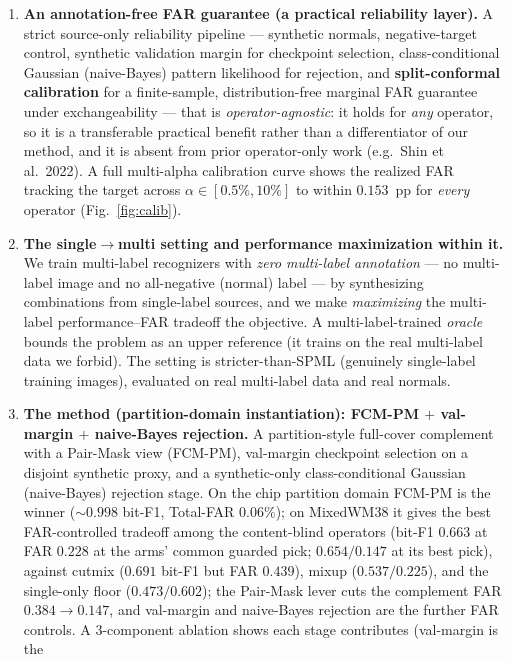 \documentclass[11pt]{article}
\begin{document}
\begin{enumerate}
  algorithmic content while independently corroborating the criterion.
\item \textbf{An annotation-free FAR guarantee (a practical reliability layer).} A strict
  source-only reliability pipeline --- synthetic normals, negative-target control, synthetic
  validation margin for checkpoint selection, class-conditional Gaussian (naive-Bayes)
  pattern likelihood for rejection, and \textbf{split-conformal calibration} for a
  finite-sample, distribution-free marginal FAR guarantee under exchangeability --- that is
  \emph{operator-agnostic}: it holds for \emph{any} operator, so it is a transferable
  practical benefit rather than a differentiator of our method, and it is absent from prior
  operator-only work (e.g.\ Shin et al.\ 2022). A full multi-alpha calibration curve shows
  the realized FAR tracking the target across $\alpha\in[0.5\%,10\%]$ to within $0.153$~pp
  for \emph{every} operator (Fig.~\ref{fig:calib}).
\item \textbf{The single$\to$multi setting and performance maximization within it.}
  We train multi-label recognizers with \emph{zero multi-label annotation} --- no
  multi-label image and no all-negative (normal) label --- by synthesizing
  combinations from single-label sources, and we make \emph{maximizing} the
  multi-label performance--FAR tradeoff the objective. A multi-label-trained
  \emph{oracle} bounds the problem as an upper reference (it trains on the real
  multi-label data we forbid). The setting is stricter-than-SPML (genuinely
  single-label training images), evaluated on real multi-label data and real normals.
\item \textbf{The method (partition-domain instantiation): FCM-PM $+$ val-margin $+$
  naive-Bayes rejection.} A partition-style full-cover complement with a Pair-Mask view
  (FCM-PM), val-margin checkpoint selection on a disjoint synthetic proxy, and a
  synthetic-only class-conditional Gaussian (naive-Bayes) rejection stage. On the chip
  partition domain FCM-PM is the winner (${\sim}0.998$ bit-F1, Total-FAR $0.06\%$); on
  MixedWM38 it gives the best FAR-controlled tradeoff among the content-blind operators
  (bit-F1 $0.663$ at FAR $0.228$ at the arms' common guarded pick; $0.654/0.147$ at its
  best pick), against cutmix ($0.691$ bit-F1 but FAR $0.439$), mixup ($0.537/0.225$),
  and the single-only floor ($0.473/0.602$); the Pair-Mask lever cuts the complement FAR
  $0.384\to0.147$, and val-margin and naive-Bayes rejection are the further FAR
  controls. A 3-component ablation shows each stage contributes (val-margin is the

\end{enumerate}
\end{document}
